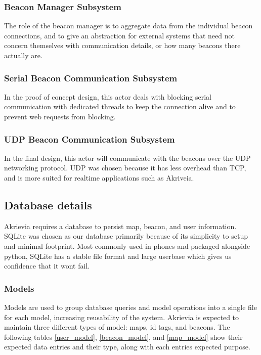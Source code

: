 \bigskip
\subsubsection{Beacon Manager Subsystem}
The role of the beacon manager is to aggregate data from the individual beacon connections, and to give an abstraction for external systems that need not concern themselves with communication details, or how many beacons there actually are.


\bigskip
\subsubsection{Serial Beacon Communication Subsystem}
In the proof of concept design, this actor deals with blocking serial communication with dedicated threads to keep the connection alive and to prevent web requests from blocking.

\bigskip
\subsubsection{UDP Beacon Communication Subsystem}
In the final design, this actor will communicate with the beacons over the UDP networking protocol.
UDP was chosen because it has less overhead than TCP, and is more suited for realtime applications such as Akriveia.

\bigskip
\subsection{Database details}
Akrievia requires a database to persist map, beacon, and user information.
SQLite was chosen as our database primarily because of its simplicity to setup and minimal footprint.
Most commonly used in phones and packaged alongside python, SQLite has a stable file format and large userbase which gives us confidence that it wont fail.

\bigskip
\subsubsection{Models}
Models are used to group database queries and model operations into a single file for each model, increasing reusability of the system.
Akrievia is expected to maintain three different types of model: maps, id tags, and beacons.
The following tables \ref{user_model}, \ref{beacon_model}, and \ref{map_model} show their expected data entries and their type, along with each entries expected purpose.

